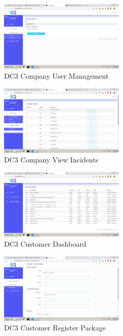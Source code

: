 \begin{figure}[htp]
    \centering
    \includegraphics[width=6cm]{images/screenshots/Company_User_Mgmt.png}    \caption{DC3 Company User Management}
    \label{fig:}
\end{figure}

\begin{figure}[htp]
    \centering
    \includegraphics[width=6cm]{images/screenshots/Company_View_Incidents.png}
    \caption{DC3 Company View Incidents}
    \label{fig:}
\end{figure}

\begin{figure}[htp]
    \centering
    \includegraphics[width=6cm]{images/screenshots/Customer_Dashboard.png}
    \caption{DC3 Customer Dashboard}
    \label{fig:}
\end{figure}

\begin{figure}[htp]
    \centering
    \includegraphics[width=6cm]{images/screenshots/Customer_Register_Package.png}
    \caption{DC3 Customer Register Package}
    \label{fig:}
\end{figure}

